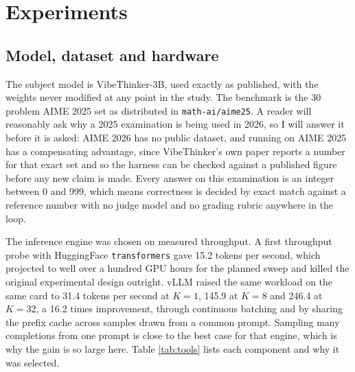 \documentclass[conference]{IEEEtran}
\begin{document}
\section{Experiments}

\subsection{Model, dataset and hardware}

The subject model is VibeThinker-3B, used exactly as published, with the weights
never modified at any point in the study. The benchmark is the 30 problem AIME
2025 set as distributed in \texttt{math-ai/aime25}. A reader will reasonably ask
why a 2025 examination is being used in 2026, so I will answer it before it is
asked: AIME 2026 has no public dataset, and running on AIME 2025 has a
compensating advantage, since VibeThinker's own paper reports a number for that
exact set and so the harness can be checked against a published figure before any
new claim is made. Every answer on this examination is an integer between 0 and
999, which means correctness is decided by exact match against a reference number
with no judge model and no grading rubric anywhere in the loop.

The inference engine was chosen on measured throughput. A
first throughput probe with HuggingFace \texttt{transformers} gave 15.2 tokens per
second, which projected to well over a hundred GPU hours for the planned sweep and
killed the original experimental design outright. vLLM \cite{vllm} raised the same
workload on the same card to 31.4 tokens per second at $K{=}1$, 145.9 at $K{=}8$
and 246.4 at $K{=}32$, a 16.2 times improvement, through continuous batching and
by sharing the prefix cache across samples drawn from a common prompt. Sampling
many completions from one prompt is close to the best case for that engine, which
is why the gain is so large here. Table \ref{tab:tools} lists each component and
why it was selected.
\end{document}
